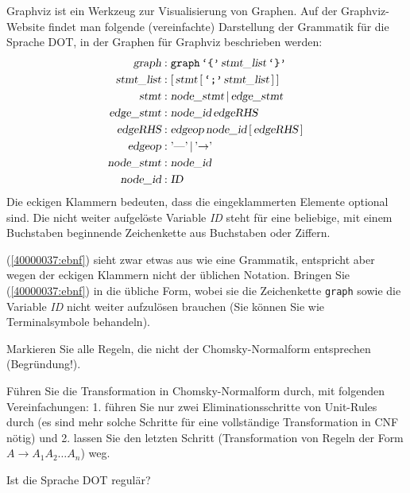 Graphviz ist ein Werkzeug zur Visualisierung von Graphen. Auf der
Graphviz-Website findet man folgende (vereinfachte) Darstellung der Grammatik
für die Sprache DOT, in der Graphen für Graphviz beschrieben werden:
\begin{equation}
\begin{aligned}
\textsl{graph}     &: \texttt{graph}\, \texttt{`\{'}\, \textsl{stmt\_list}\, \texttt{`\}'} \\
\textsl{stmt\_list}&: [\, \textsl{stmt}\, [\, \texttt{`;'}\, \textsl{stmt\_list}\, ]\, ] \\
\textsl{stmt}      &: \textsl{node\_stmt}\, |\, \textsl{edge\_stmt} \\
\textsl{edge\_stmt}&: \textsl{node\_id}\, \textsl{edgeRHS} \\
\textsl{edgeRHS}   &: \textsl{edgeop}\, \textsl{node\_id}\, [\, \textsl{edgeRHS}\, ]\, \\
\textsl{edgeop}    &: \textrm{'\text{---}'}\, |\, \textrm{'$\rightarrow$'}\, \\
\textsl{node\_stmt}&: \textsl{node\_id} \\
\textsl{node\_id}  &: \textsl{ID}
\end{aligned}
\label{40000037:ebnf}
\end{equation}
Die eckigen Klammern bedeuten, dass die eingeklammerten Elemente optional sind.
Die nicht weiter aufgelöste Variable \textsl{ID} steht für eine beliebige,
mit einem Buchstaben beginnende Zeichenkette aus Buchstaben oder Ziffern.

\begin{teilaufgaben}
\item
(\ref{40000037:ebnf}) sieht zwar etwas aus wie eine Grammatik,
entspricht aber wegen der eckigen Klammern nicht der üblichen Notation.
Bringen Sie (\ref{40000037:ebnf}) in die übliche Form, wobei sie
die Zeichenkette \texttt{graph} sowie die Variable
\textsl{ID} nicht weiter aufzulösen brauchen (Sie können Sie wie Terminalsymbole
behandeln).
\item Markieren Sie alle Regeln, die nicht der Chomsky-Normalform 
entsprechen (Begründung!).
\item Führen Sie die Transformation in Chomsky-Normalform durch, mit folgenden
Vereinfachungen: 1. führen Sie nur zwei Eliminationsschritte von Unit-Rules durch
(es sind mehr solche Schritte für eine vollständige Transformation in CNF nötig)
und 2. lassen Sie den letzten Schritt (Transformation von Regeln der Form
$A\to A_1A_2\dots A_n$) weg.
\item Ist die Sprache DOT regulär?
\end{teilaufgaben}

